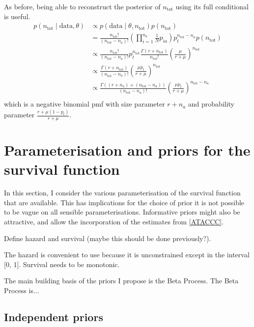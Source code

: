 \documentclass[main.tex]{subfiles}
\begin{document}
As before, being able to reconstruct the posterior of $n_\text{tot}$
using its full conditional is useful.
\begin{align}
p(n_\text{tot} \mid \text{data}, \theta)
&\propto p(\text{data} \mid \theta, n_\text{tot}) p(n_\text{tot}) \\
&= \frac{n_\text{tot}!}{(n_\text{tot}-n_a)!} \left( \prod_{i=1}^{n_a} \frac{1}{N} p_{ia} \right) p_t^{n_\text{tot}-n_a} p(n_\text{tot}) \\
&\propto \frac{n_\text{tot}!}{(n_\text{tot}-n_a)!} p_t^{n_\text{tot}} \frac{\Gamma(r + n_\text{tot})}{n_\text{tot}!} \left( \frac{\mu}{r + \mu} \right)^{n_\text{tot}}  \\
&\propto \frac{\Gamma(r + n_\text{tot})}{(n_\text{tot}-n_a)!} \left( \frac{\mu p_t}{r + \mu} \right)^{n_\text{tot}}  \\
&\propto \frac{\Gamma((r + n_a) + (n_\text{tot}- n_a))}{(n_\text{tot}-n_a)!} \left( \frac{\mu p_t}{r + \mu} \right)^{n_\text{tot}-n_a}  \\
\end{align}
which is a negative binomial pmf with size parameter $r + n_a$ and
probability parameter $\frac{r+\mu(1-p_t)}{r+\mu}$.

\section{Parameterisation and priors for the survival function} \label{perf-test:sec:parameters-priors}


In this section, I consider the various parameterisation of the survival function that are available.
This has implications for the choice of prior  it is not possible to be vague on all sensible parameterisations.
Informative priors might also be attractive, and allow the incorporation of the estimates from \autoref{ATACCC}.

Define hazard and survival (maybe this should be done previously?).

The hazard is convenient to use because it is unconstrained except in the interval [0, 1].
Survival needs to be monotonic.

The main building basis of the priors I propose is the Beta Process.
The Beta Process is...

\subsection{Independent priors}
\end{document}
